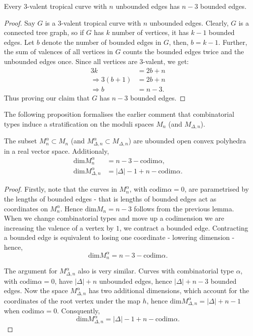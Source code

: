 \begin{lemma}
    \label{graphLem}
    Every $3$-valent tropical curve with $n$ unbounded edges has $n-3$ bounded edges.
\end{lemma}
\begin{proof}
    Say $G$ is a $3$-valent tropical curve with $n$ unbounded edges. 
    Clearly, $G$ is a connected tree graph, so if $G$ has $k$ number of vertices, it has $k-1$ bounded edges. 
    Let $b$ denote the number of bounded edges in $G$, then, $b = k-1$. 
    Further, the sum of valences of all vertices in $G$ counts the bounded edges twice and the unbounded edges once.
    Since all vertices are $3$-valent, we get:
    \begin{align*}
        3k &= 2b + n \\
        \Rightarrow 3(b+1) &= 2b + n\\
        \Rightarrow b &= n-3.
    \end{align*}
    Thus proving our claim that $G$ has $n-3$ bounded edges.
\end{proof}

The following proposition formalises the earlier comment that combinatorial types induce a stratification on the moduli spaces $M_{n}$ (and $M_{\Delta, n}$).

\begin{proposition}
    The subset $M^{\alpha}_{n} \subset M_{n}$ (and $M^{\alpha}_{\Delta,n} \subset M_{\Delta,n}$) are ubounded open convex polyhedra in a real vector space. 
    Additionaly,
    \begin{align*}
        \text{dim}M_{n}^{\alpha} &= n-3-\text{codim}\alpha,\\
        \text{dim}M^{\alpha}_{\Delta, n} &= |\Delta| - 1 + n - \text{codim}\alpha.
    \end{align*}
\end{proposition}
\begin{proof}
    Firstly, note that the curves in $M^{\alpha}_{n}$, with $\text{codim}\alpha = 0$, are parametrised by the lengths of bounded edges - that is lengths of bounded edges act as coordinates on $M^{\alpha}_{n}$.
    Hence $\text{dim}M_{n} = n-3$ follows from the previous lemma.
    When we change combinatorial types and move up a codimension we are increasing the valence of a vertex by $1$, we contract a bounded edge.
    Contracting a bounded edge is equivalent to losing one coordinate - lowering dimension - hence,
    \[
        \text{dim}M_{n}^{\alpha} = n-3-\text{codim}\alpha.
    \]
    \par The argument for $M^{\alpha}_{\Delta,n}$ also is very similar.
    Curves with combinatorial type $\alpha$, with $\text{codim}\alpha = 0$, have $|\Delta|+n$ unbounded edges, hence $|\Delta| + n - 3$ bounded edges.
    Now the space $M^{\alpha}_{\Delta,n}$ has two additional dimensions, which account for the coordinates of the root vertex under the map $h$, hence $\text{dim}M^{\alpha}_{\Delta,n} = |\Delta| + n - 1$ when $\text{codim}\alpha = 0$.
    Consquently,
    \[
        \text{dim}M^{\alpha}_{\Delta, n} = |\Delta| - 1 + n - \text{codim}\alpha.
    \]
\end{proof}

